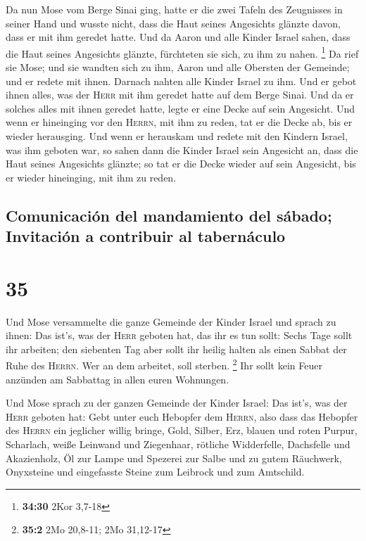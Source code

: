  Da nun Mose vom Berge Sinai ging, hatte er die zwei
Tafeln des Zeugnisses in seiner Hand und wusste nicht, dass die Haut
seines Angesichts glänzte davon, dass er mit ihm geredet hatte.
 Und da Aaron und alle Kinder Israel sahen, dass die Haut
seines Angesichts glänzte, fürchteten sie sich, zu ihm zu nahen.
\footnote{\textbf{34:30} 2Kor 3,7-18}  Da rief sie Mose;
und sie wandten sich zu ihm, Aaron und alle Obersten der Gemeinde; und
er redete mit ihnen.  Darnach nahten alle Kinder Israel
zu ihm. Und er gebot ihnen alles, was der \textsc{Herr} mit ihm geredet
hatte auf dem Berge Sinai.  Und da er solches alles mit
ihnen geredet hatte, legte er eine Decke auf sein Angesicht.
 Und wenn er hineinging vor den \textsc{Herrn}, mit ihm
zu reden, tat er die Decke ab, bis er wieder herausging. Und wenn er
herauskam und redete mit den Kindern Israel, was ihm geboten war,
 so sahen dann die Kinder Israel sein Angesicht an, dass
die Haut seines Angesichts glänzte; so tat er die Decke wieder auf sein
Angesicht, bis er wieder hineinging, mit ihm zu reden.

\hypertarget{comunicaciuxf3n-del-mandamiento-del-suxe1bado-invitaciuxf3n-a-contribuir-al-tabernuxe1culo}{%
\subsection{Comunicación del mandamiento del sábado; Invitación a
contribuir al
tabernáculo}\label{comunicaciuxf3n-del-mandamiento-del-suxe1bado-invitaciuxf3n-a-contribuir-al-tabernuxe1culo}}

\hypertarget{section-34}{%
\section{35}\label{section-34}}

 Und Mose versammelte die ganze Gemeinde der Kinder Israel
und sprach zu ihnen: Das ist's, was der \textsc{Herr} geboten hat, das
ihr es tun sollt:  Sechs Tage sollt ihr arbeiten; den
siebenten Tag aber sollt ihr heilig halten als einen Sabbat der Ruhe des
\textsc{Herrn}. Wer an dem arbeitet, soll sterben. \footnote{\textbf{35:2}
  2Mo 20,8-11; 2Mo 31,12-17}  Ihr sollt kein Feuer
anzünden am Sabbattag in allen euren Wohnungen.

 Und Mose sprach zu der ganzen Gemeinde der Kinder Israel:
Das ist's, was der \textsc{Herr} geboten hat:  Gebt unter
euch Hebopfer dem \textsc{Herrn}, also dass das Hebopfer des
\textsc{Herrn} ein jeglicher willig bringe, Gold, Silber, Erz,
 blauen und roten Purpur, Scharlach, weiße Leinwand und
Ziegenhaar,  rötliche Widderfelle, Dachsfelle und
Akazienholz,  Öl zur Lampe und Spezerei zur Salbe und zu
gutem Räuchwerk,  Onyxsteine und eingefasste Steine zum
Leibrock und zum Amtschild.


